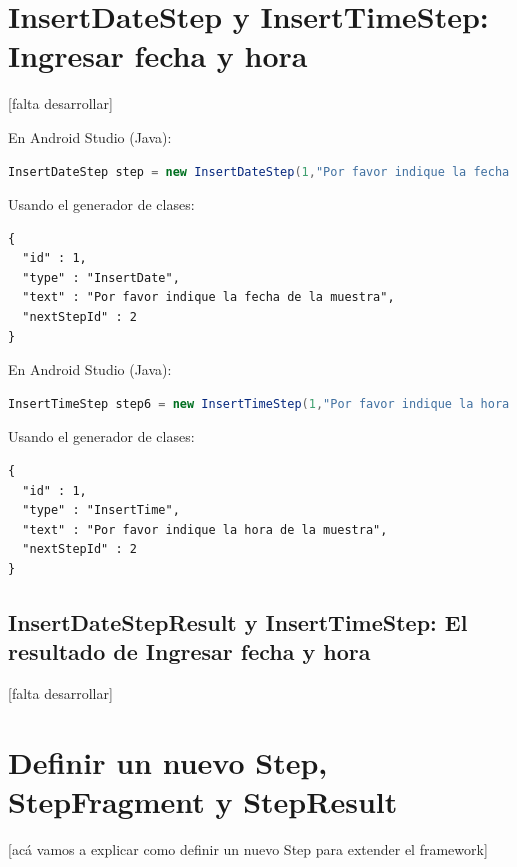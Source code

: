 \section{InsertDateStep y InsertTimeStep: Ingresar fecha y hora}
[falta desarrollar]

En Android Studio (Java):
\begin{lstlisting}[language=Java, frame=tlb]	
InsertDateStep step = new InsertDateStep(1,"Por favor indique la fecha de la muestra",2); 
\end{lstlisting}

Usando el generador de clases:
\begin{lstlisting}[language=XML, frame=tlb]	
{
  "id" : 1,
  "type" : "InsertDate",
  "text" : "Por favor indique la fecha de la muestra",
  "nextStepId" : 2
}
\end{lstlisting}

En Android Studio (Java):
\begin{lstlisting}[language=Java, frame=tlb]	
InsertTimeStep step6 = new InsertTimeStep(1,"Por favor indique la hora de la muestra",2); 
\end{lstlisting}

Usando el generador de clases:
\begin{lstlisting}[language=XML, frame=tlb]	
{
  "id" : 1,
  "type" : "InsertTime",
  "text" : "Por favor indique la hora de la muestra",
  "nextStepId" : 2
}
\end{lstlisting}

\subsection{InsertDateStepResult y InsertTimeStep: El resultado de Ingresar fecha y hora}
[falta desarrollar]



\section{Definir un nuevo Step, StepFragment y StepResult} \label{sec:definir_steps}
[acá vamos a explicar como definir un nuevo Step para extender el framework]



